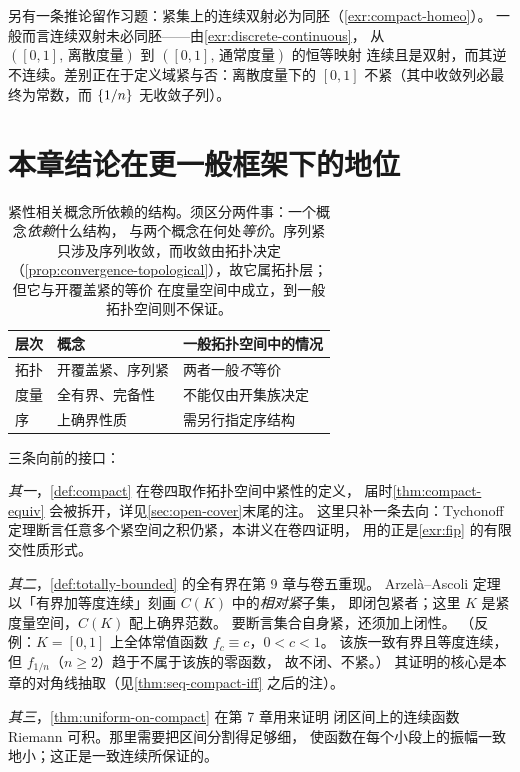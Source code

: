 另有一条推论留作习题：紧集上的连续双射必为同胚（\cref{exr:compact-homeo}）。
一般而言连续双射未必同胚——由\cref{exr:discrete-continuous}，
从 \(([0,1],\,\text{离散度量})\) 到 \(([0,1],\,\text{通常度量})\) 的恒等映射
连续且是双射，而其逆不连续。差别正在于定义域紧与否：离散度量下的
\([0,1]\) 不紧（其中收敛列必最终为常数，而 \(\{1/n\}\) 无收敛子列）。

\section{本章结论在更一般框架下的地位}
\label{sec:ch4-outlook}

\begin{table}[htbp]
  \centering
  \caption{紧性相关概念所依赖的结构。须区分两件事：一个概念\emph{依赖}什么结构，
    与两个概念在何处\emph{等价}。序列紧只涉及序列收敛，而收敛由拓扑决定
    （\cref{prop:convergence-topological}），故它属拓扑层；但它与开覆盖紧的等价
    在度量空间中成立，到一般拓扑空间则不保证。}
  \label{tab:ch4-structure}
  \begin{tabular}{@{}lll@{}}
    \toprule
    层次 & 概念 & 一般拓扑空间中的情况 \\
    \midrule
    拓扑 & 开覆盖紧、序列紧 & 两者一般\emph{不}等价 \\
    度量 & 全有界、完备性   & 不能仅由开集族决定 \\
    序   & 上确界性质       & 需另行指定序结构 \\
    \bottomrule
  \end{tabular}
\end{table}

三条向前的接口：

\emph{其一}，\cref{def:compact} 在卷四取作拓扑空间中紧性的定义，
届时\cref{thm:compact-equiv} 会被拆开，详见\cref{sec:open-cover}末尾的注。
这里只补一条去向：Tychonoff 定理断言任意多个紧空间之积仍紧，本讲义在卷四证明，
用的正是\cref{exr:fip} 的有限交性质形式。

\emph{其二}，\cref{def:totally-bounded} 的全有界在第 9 章与卷五重现。
Arzelà--Ascoli 定理以「有界加等度连续」刻画 \(C(K)\) 中的\emph{相对紧}子集，
即闭包紧者；这里 \(K\) 是紧度量空间，\(C(K)\) 配上确界范数。
要断言集合自身紧，还须加上闭性。
（反例：\(K=[0,1]\) 上全体常值函数 \(f_{c} \equiv c\)，\(0<c<1\)。
该族一致有界且等度连续，但 \(f_{1/n}\)（\(n \ge 2\)）趋于不属于该族的零函数，
故不闭、不紧。）
其证明的核心是本章的对角线抽取（见\cref{thm:seq-compact-iff} 之后的注）。

\emph{其三}，\cref{thm:uniform-on-compact} 在第 7 章用来证明
闭区间上的连续函数 Riemann 可积。那里需要把区间分割得足够细，
使函数在每个小段上的振幅一致地小；这正是一致连续所保证的。

